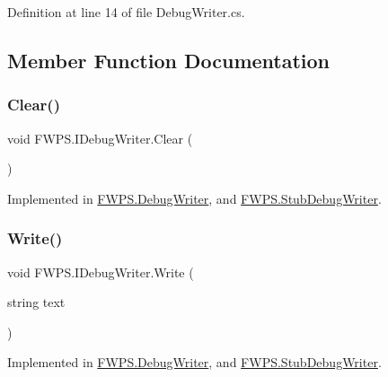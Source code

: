 Definition at line 14 of file Debug\+Writer.\+cs.



\subsection{Member Function Documentation}
\mbox{\label{interface_f_w_p_s_1_1_i_debug_writer_afe3fafb517c1a3ba057d6d3ed4da0285}} 
\subsubsection{\texorpdfstring{Clear()}{Clear()}}
{\footnotesize\ttfamily void F\+W\+P\+S.\+I\+Debug\+Writer.\+Clear (\begin{DoxyParamCaption}{ }\end{DoxyParamCaption})}



Implemented in \mbox{\hyperlink{class_f_w_p_s_1_1_debug_writer_ab34d96db0bb866e444604b733171519c}{F\+W\+P\+S.\+Debug\+Writer}}, and \mbox{\hyperlink{class_f_w_p_s_1_1_stub_debug_writer_a18682f40a0653f9ec10e49eadb99af57}{F\+W\+P\+S.\+Stub\+Debug\+Writer}}.

\mbox{\label{interface_f_w_p_s_1_1_i_debug_writer_a826f82ffa90498afa817f5eef274d5dc}} 
\subsubsection{\texorpdfstring{Write()}{Write()}}
{\footnotesize\ttfamily void F\+W\+P\+S.\+I\+Debug\+Writer.\+Write (\begin{DoxyParamCaption}\item[{string}]{text }\end{DoxyParamCaption})}



Implemented in \mbox{\hyperlink{class_f_w_p_s_1_1_debug_writer_a5bcf9f0db8527f6440d749910e276998}{F\+W\+P\+S.\+Debug\+Writer}}, and \mbox{\hyperlink{class_f_w_p_s_1_1_stub_debug_writer_a7c7382228333a504cce7ae7fc8bdd25f}{F\+W\+P\+S.\+Stub\+Debug\+Writer}}.



